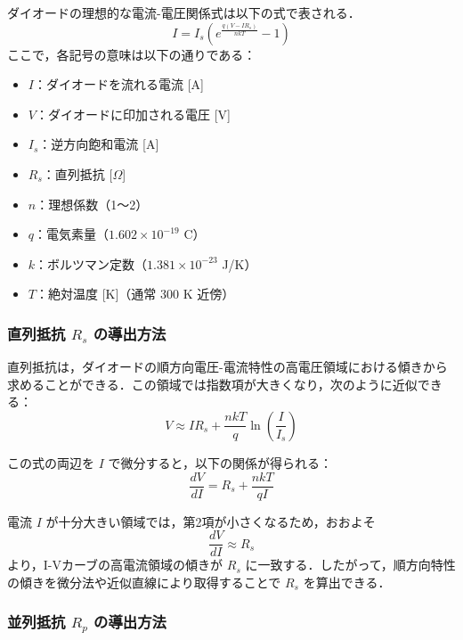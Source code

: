 ダイオードの理想的な電流-電圧関係式は以下の式で表される．
\begin{equation}
    I = I_s \left( e^{\frac{q(V - IR_s)}{nkT}} - 1 \right)
\end{equation}
ここで，各記号の意味は以下の通りである：
\begin{itemize}
    \item \( I \)：ダイオードを流れる電流 [A]
    \item \( V \)：ダイオードに印加される電圧 [V]
    \item \( I_s \)：逆方向飽和電流 [A]
    \item \( R_s \)：直列抵抗 [\(\Omega\)]
    \item \( n \)：理想係数（1〜2）
    \item \( q \)：電気素量（\(1.602 \times 10^{-19}\) C）
    \item \( k \)：ボルツマン定数（\(1.381 \times 10^{-23}\) J/K）
    \item \( T \)：絶対温度 [K]（通常 300 K 近傍）
\end{itemize}

\subsubsection*{直列抵抗 \( R_s \) の導出方法}

直列抵抗は，ダイオードの順方向電圧-電流特性の高電圧領域における傾きから求めることができる．この領域では指数項が大きくなり，次のように近似できる：
\begin{equation}
    V \approx IR_s + \frac{nkT}{q} \ln \left( \frac{I}{I_s} \right)
\end{equation}

この式の両辺を \( I \) で微分すると，以下の関係が得られる：
\begin{equation}
    \frac{dV}{dI} = R_s + \frac{nkT}{qI}
\end{equation}

電流 \( I \) が十分大きい領域では，第2項が小さくなるため，おおよそ
\begin{equation}
    \frac{dV}{dI} \approx R_s
\end{equation}
より，I-Vカーブの高電流領域の傾きが \( R_s \) に一致する．したがって，順方向特性の傾きを微分法や近似直線により取得することで \( R_s \) を算出できる．

\subsubsection*{並列抵抗 \( R_p \) の導出方法}

